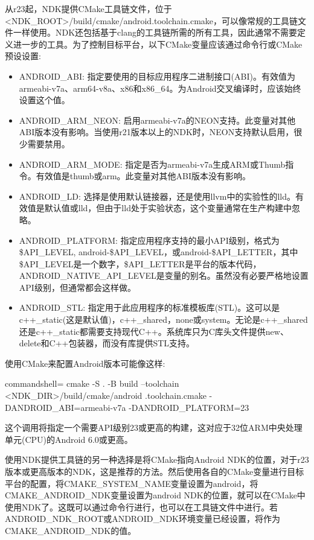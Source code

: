 从r23起，NDK提供CMake工具链文件，位于<NDK\_ROOT>/build/cmake/android.toolchain.cmake，可以像常规的工具链文件一样使用。NDK还包括基于clang的工具链所需的所有工具，因此通常不需要定义进一步的工具。为了控制目标平台，以下CMake变量应该通过命令行或CMake预设设置:

\begin{itemize}
\item 
ANDROID\_ABI: 指定要使用的目标应用程序二进制接口(ABI)。有效值为armeabi-v7a、arm64-v8a、x86和x86\_64。为Android交叉编译时，应该始终设置这个值。

\item 
ANDROID\_ARM\_NEON: 启用armeabi-v7a的NEON支持。此变量对其他ABI版本没有影响。当使用r21版本以上的NDK时，NEON支持默认启用，很少需要禁用。

\item 
ANDROID\_ARM\_MODE: 指定是否为armeabi-v7a生成ARM或Thumb指令。有效值是thumb或arm。此变量对其他ABI版本没有影响。

\item 
ANDROID\_LD: 选择是使用默认链接器，还是使用llvm中的实验性的lld。有效值是默认值或lld，但由于lld处于实验状态，这个变量通常在生产构建中忽略。

\item 
ANDROID\_PLATFORM: 指定应用程序支持的最小API级别，格式为\$API\_LEVEL, android-\$API\_LEVEL，或android-\$API\_LETTER，其中\$API\_LEVEL是一个数字，\$API\_LETTER是平台的版本代码，ANDROID\_NATIVE\_API\_LEVEL是变量的别名。虽然没有必要严格地设置API级别，但通常都会这样做。

\item 
ANDROID\_STL: 指定用于此应用程序的标准模板库(STL)。这可以是c++\_static(这是默认值)，c++\_shared，none或system。无论是c++\_shared还是c++\_static都需要支持现代C++。系统库只为C库头文件提供new、delete和C++包装器，而没有库提供STL支持。
\end{itemize}

使用CMake来配置Android版本可能像这样:

\begin{tcblisting}{commandshell={}}
cmake -S . -B build --toolchain <NDK_DIR>/build/cmake/android
  .toolchain.cmake -DANDROID_ABI=armeabi-v7a -DANDROID_PLATFORM=23
\end{tcblisting}

这个调用将指定一个需要API级别23或更高的构建，这对应于32位ARM中央处理单元(CPU)的Android 6.0或更高。

使用NDK提供工具链的另一种选择是将CMake指向Android NDK的位置，对于r23版本或更高版本的NDK，这是推荐的方法。然后使用各自的CMake变量进行目标平台的配置，将CMAKE\_SYSTEM\_NAME变量设置为android，将CMAKE\_ANDROID\_NDK变量设置为android NDK的位置，就可以在CMake中使用NDK了。这既可以通过命令行进行，也可以在工具链文件中进行。若ANDROID\_NDK\_ROOT或ANDROID\_NDK环境变量已经设置，将作为CMAKE\_ANDROID\_NDK的值。


